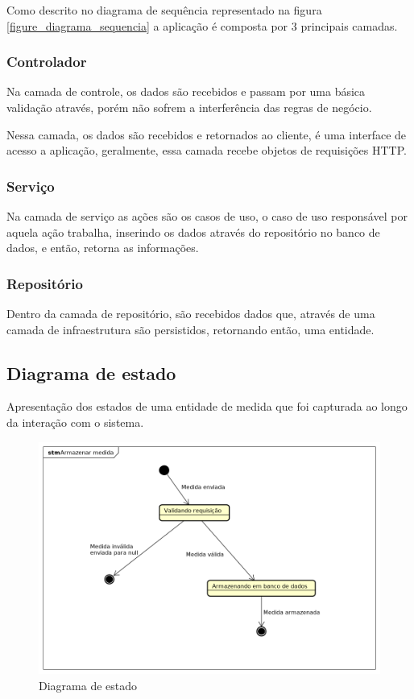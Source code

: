 Como descrito no diagrama de sequência representado na figura \ref{figure_diagrama_sequencia} a aplicação é composta por 3 principais camadas.

\subsubsection{Controlador}

Na camada de controle, os dados são recebidos e passam por uma básica validação através, porém não sofrem a interferência das regras de negócio.

Nessa camada, os dados são recebidos e retornados ao cliente, é uma interface de acesso a aplicação, geralmente, essa camada recebe objetos de requisições HTTP.

\subsubsection{Serviço}

Na camada de serviço as ações são os casos de uso, o caso de uso responsável por aquela ação trabalha, inserindo os dados através do repositório no banco de dados, e então, retorna as informações.

\subsubsection{Repositório}

Dentro da camada de repositório, são recebidos dados que, através de uma camada de infraestrutura são persistidos, retornando então, uma entidade.

\subsection{Diagrama de estado}

Apresentação dos estados de uma entidade de medida que foi capturada ao longo da interação com o sistema.

\begin{figure}[H]
    \label{figure_diagrama_estado}
    \centering
    \caption{Diagrama de estado}
    \includegraphics[scale=0.6]{diagrams/estado.png}
    \hfill
\end{figure}

